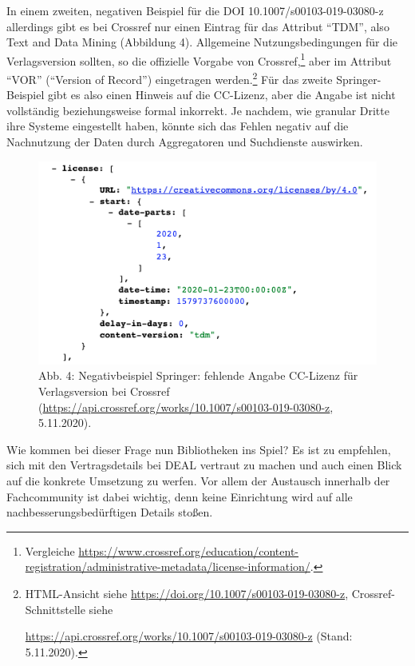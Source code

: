 \documentclass[a4paper,
fontsize=11pt,
oneside,
numbers=noperiodatend,
parskip=half-,
bibliography=totoc,
final
]{scrartcl}
\begin{document}
In einem zweiten, negativen Beispiel für die DOI
10.1007/s00103-019-03080-z allerdings gibt es bei Crossref nur einen
Eintrag für das Attribut \enquote{TDM}, also Text and Data Mining (Abbildung 4).
Allgemeine Nutzungsbedingungen für die Verlagsversion sollten, so die
offizielle Vorgabe von Crossref,\footnote{Vergleiche
  \url{https://www.crossref.org/education/content-registration/administrative-metadata/license-information/}.}
aber im Attribut \enquote{VOR} (\enquote{Version of Record}) eingetragen
werden.\footnote{HTML-Ansicht siehe
  \url{https://doi.org/10.1007/s00103-019-03080-z},
  Crossref-Schnittstelle siehe

  \url{https://api.crossref.org/works/10.1007/s00103-019-03080-z} (Stand:
  5.11.2020).} Für das zweite Springer-Beispiel gibt es also einen
Hinweis auf die CC-Lizenz, aber die Angabe ist nicht vollständig
beziehungsweise formal inkorrekt. Je nachdem, wie granular Dritte ihre
Systeme eingestellt haben, könnte sich das Fehlen negativ auf die
Nachnutzung der Daten durch Aggregatoren und Suchdienste auswirken.

\begin{figure}
\centering
\includegraphics{img/CRspringerNEG.png}
\caption{Abb. 4: Negativbeispiel Springer: fehlende Angabe CC-Lizenz für
Verlagsversion bei Crossref
(\url{https://api.crossref.org/works/10.1007/s00103-019-03080-z},
5.11.2020).}
\end{figure}

Wie kommen bei dieser Frage nun Bibliotheken ins Spiel? Es ist zu
empfehlen, sich mit den Vertragsdetails bei DEAL vertraut zu machen und
auch einen Blick auf die konkrete Umsetzung zu werfen. Vor allem der
Austausch innerhalb der Fachcommunity ist dabei wichtig, denn keine
Einrichtung wird auf alle nachbesserungsbedürftigen Details stoßen.
\end{document}
